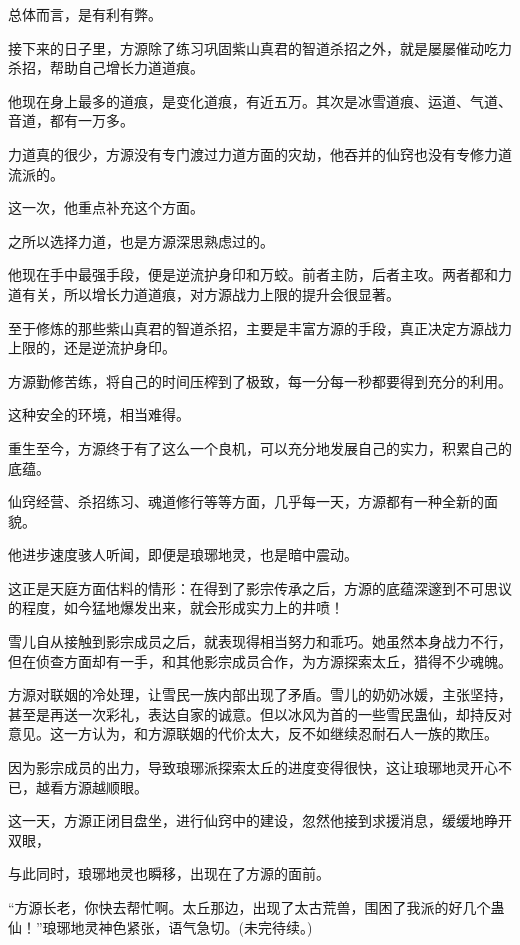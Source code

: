 \begin{this_body}
总体而言，是有利有弊。

接下来的日子里，方源除了练习巩固紫山真君的智道杀招之外，就是屡屡催动吃力杀招，帮助自己增长力道道痕。

他现在身上最多的道痕，是变化道痕，有近五万。其次是冰雪道痕、运道、气道、音道，都有一万多。

力道真的很少，方源没有专门渡过力道方面的灾劫，他吞并的仙窍也没有专修力道流派的。

这一次，他重点补充这个方面。

之所以选择力道，也是方源深思熟虑过的。

他现在手中最强手段，便是逆流护身印和万蛟。前者主防，后者主攻。两者都和力道有关，所以增长力道道痕，对方源战力上限的提升会很显著。

至于修炼的那些紫山真君的智道杀招，主要是丰富方源的手段，真正决定方源战力上限的，还是逆流护身印。

方源勤修苦练，将自己的时间压榨到了极致，每一分每一秒都要得到充分的利用。

这种安全的环境，相当难得。

重生至今，方源终于有了这么一个良机，可以充分地发展自己的实力，积累自己的底蕴。

仙窍经营、杀招练习、魂道修行等等方面，几乎每一天，方源都有一种全新的面貌。

他进步速度骇人听闻，即便是琅琊地灵，也是暗中震动。

这正是天庭方面估料的情形：在得到了影宗传承之后，方源的底蕴深邃到不可思议的程度，如今猛地爆发出来，就会形成实力上的井喷！

雪儿自从接触到影宗成员之后，就表现得相当努力和乖巧。她虽然本身战力不行，但在侦查方面却有一手，和其他影宗成员合作，为方源探索太丘，猎得不少魂魄。

方源对联姻的冷处理，让雪民一族内部出现了矛盾。雪儿的奶奶冰媛，主张坚持，甚至是再送一次彩礼，表达自家的诚意。但以冰风为首的一些雪民蛊仙，却持反对意见。这一方认为，和方源联姻的代价太大，反不如继续忍耐石人一族的欺压。

因为影宗成员的出力，导致琅琊派探索太丘的进度变得很快，这让琅琊地灵开心不已，越看方源越顺眼。

这一天，方源正闭目盘坐，进行仙窍中的建设，忽然他接到求援消息，缓缓地睁开双眼，

与此同时，琅琊地灵也瞬移，出现在了方源的面前。

“方源长老，你快去帮忙啊。太丘那边，出现了太古荒兽，围困了我派的好几个蛊仙！”琅琊地灵神色紧张，语气急切。(未完待续。)

\end{this_body}

